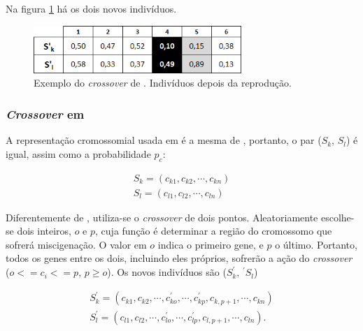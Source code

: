 Na figura \ref{fig:cross2004_tabelaDepois} há os dois novos indivíduos.

\begin{figure}[htbp]
	\centering
		\includegraphics[width=0.70\textwidth]{figs/materiais_metodo/autovalores_com_ga/cross2004_tabelaDepois.png}
	\caption{Exemplo do \emph{crossover} de \cite{metodo2004}. Indivíduos depois da reprodução.}
	\label{fig:cross2004_tabelaDepois}
\end{figure}

\subsubsection{\emph{Crossover} em \cite{metodo2011}}	

	A representação cromossomial usada em \cite{metodo2011} é a mesma de \cite{metodo2004}, portanto, o par ($S_k$, $S_l$) é igual, assim como a probabilidade $p_c$:
	
	\begin{equation}
		\begin{array}{l}
		S_k = (c_{k1}, c_{k2}, \cdots, c_{kn})	\\
		S_l = (c_{l1}, c_{l2}, \cdots, c_{ln})	
		\end{array}
	\end{equation}
	
	Diferentemente de \cite{metodo2004}, utiliza-se o \emph{crossover} de dois pontos. Aleatoriamente escolhe-se dois inteiros, $o$ e $p$, cuja função é determinar a região do cromossomo que sofrerá miscigenação. O valor em $o$ indica o primeiro gene, e $p$ o último. Portanto, todos os genes entre os dois, incluindo eles próprios, sofrerão a ação do \emph{crossover} ($o <= c_i <= p$, $p \geq o$). Os novos indivíduos são ($S^{'}_k$, $^{'}S_l$)
	
	\begin{equation}
		\begin{array}{l}
			S^{'}_k = (c_{k1}, c_{k2}, \cdots, c^{'}_{ko}, \cdots , c^{'}_{kp}, c_{k,p+1}, \cdots, c_{kn})	\\
			S^{'}_l = (c_{l1}, c_{l2}, \cdots, c^{'}_{lo}, \cdots , c^{'}_{lp}, c_{l,p+1}, \cdots, c_{ln}).	
		\end{array}
	\end{equation}
	
